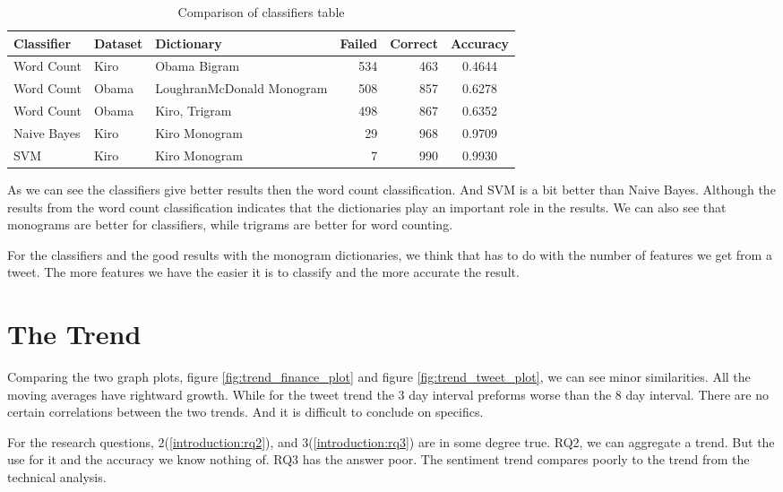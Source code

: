 \begin{table}
\centering
\label{tbl:classification_comparison}
\caption{Comparison of classifiers table}
\begin{tabular}{ l l p{3.5cm} r r c }
Classifier & Dataset & Dictionary & Failed & Correct & Accuracy \\
\hline
Word Count & Kiro & Obama Bigram & 534 & 463 & 0.4644 \\
Word Count & Obama & LoughranMcDonald Monogram & 508 & 857 & 0.6278 \\
Word Count & Obama & Kiro, Trigram & 498 & 867 & 0.6352 \\
Naive Bayes & Kiro & Kiro Monogram & 29 & 968 & 0.9709 \\
SVM & Kiro & Kiro Monogram & 7 & 990 & 0.9930 \\
\end{tabular}
\end{table}

As we can see the classifiers give better results then the word count
classification. And SVM is a bit better than Naive Bayes. Although the results
from the word count classification indicates that the dictionaries play an
important role in the results. We can also see that monograms are better for
classifiers, while trigrams are better for word counting.

For the classifiers and the good results with the monogram dictionaries, we
think
that has to do with the number of features we get from a tweet. The more
features we have the easier it is to classify and the more accurate the result.
%

\section{The Trend}\label{results:trend}
Comparing the two graph plots, figure \ref{fig:trend_finance_plot} and figure
\ref{fig:trend_tweet_plot}, we can see minor similarities. All the moving
averages have rightward growth. While for the tweet trend the 3 day interval
preforms worse than the 8 day interval. There are no certain correlations
between the two trends. And it is difficult to conclude on specifics. 

For the research questions, 2(\ref{introduction:rq2}), and
3(\ref{introduction:rq3}) are in some degree true. RQ2, we can aggregate a
trend. But the use for it and the accuracy we know nothing of. RQ3 has the
answer poor. The sentiment trend compares poorly to the trend from the technical
analysis. 
%

